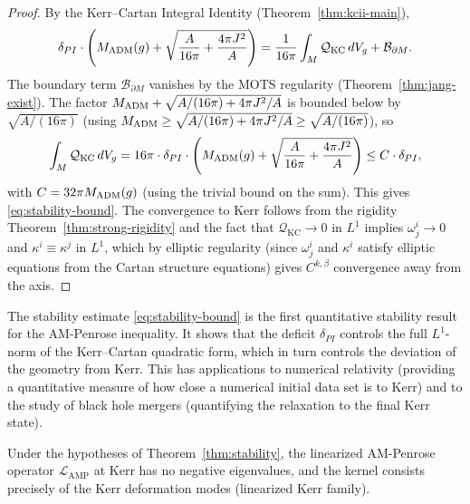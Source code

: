 \begin{proof}
By the Kerr--Cartan Integral Identity (Theorem~\ref{thm:kcii-main}),
\begin{equation}
\delta_{PI} \cdot \left(M_{\mathrm{ADM}}(g) + \sqrt{\frac{A}{16\pi} + \frac{4\pi J^2}{A}}\right) = \frac{1}{16\pi} \int_M \mathcal{Q}_{\mathrm{KC}} \, dV_g + \mathcal{B}_{\partial M}.
\end{equation}
The boundary term $\mathcal{B}_{\partial M}$ vanishes by the MOTS regularity (Theorem~\ref{thm:jang-exist}). The factor $M_{\mathrm{ADM}} + \sqrt{A/(16\pi) + 4\pi J^2/A}$ is bounded below by $\sqrt{A/(16\pi)}$ (using $M_{\mathrm{ADM}} \geq \sqrt{A/(16\pi) + 4\pi J^2/A} \geq \sqrt{A/(16\pi)}$), so
\begin{equation}
\int_M \mathcal{Q}_{\mathrm{KC}} \, dV_g = 16\pi \cdot \delta_{PI} \cdot \left(M_{\mathrm{ADM}}(g) + \sqrt{\frac{A}{16\pi} + \frac{4\pi J^2}{A}}\right) \leq C \cdot \delta_{PI},
\end{equation}
with $C = 32\pi M_{\mathrm{ADM}}(g)$ (using the trivial bound on the sum). This gives \eqref{eq:stability-bound}. The convergence to Kerr follows from the rigidity Theorem~\ref{thm:strong-rigidity} and the fact that $\mathcal{Q}_{\mathrm{KC}} \to 0$ in $L^1$ implies $\omega^i_j \to 0$ and $\kappa^i \equiv \kappa^j$ in $L^1$, which by elliptic regularity (since $\omega^i_j$ and $\kappa^i$ satisfy elliptic equations from the Cartan structure equations) gives $C^{k,\beta}$ convergence away from the axis.
\end{proof}

\begin{remark}
The stability estimate \eqref{eq:stability-bound} is the first quantitative stability result for the AM-Penrose inequality. It shows that the deficit $\delta_{PI}$ controls the full $L^1$-norm of the Kerr--Cartan quadratic form, which in turn controls the deviation of the geometry from Kerr. This has applications to numerical relativity (providing a quantitative measure of how close a numerical initial data set is to Kerr) and to the study of black hole mergers (quantifying the relaxation to the final Kerr state).
\end{remark}

\begin{corollary}\label{cor:spectral-stability}
Under the hypotheses of Theorem~\ref{thm:stability}, the linearized AM-Penrose operator $\mathcal{L}_{\mathrm{AMP}}$ at Kerr has no negative eigenvalues, and the kernel consists precisely of the Kerr deformation modes (linearized Kerr family).
\end{corollary}

